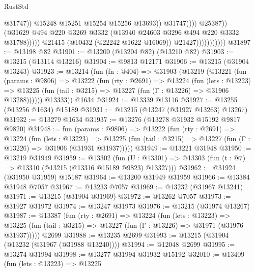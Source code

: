 \begin{lexlean}{RustStd}
\begin{coremodule}
                                                    @31747))
                                                @15248
                                                @15251
                                                @15254
                                                @15256
                                                @13693))
                                            @31747))))
                                    @25387))
                                (@31629
                                  @494
                                  @220
                                  @3269
                                  @3332
                                  (@13940 @24603 @3296 @494 @220 @3332 @31788)))))
                          @21415
                          (@10432 (@22242 @1622 @16069))
                          @21427)))))))))))
@31897 := @13198 @82
@31901 := @13200 (@13204 @82) (@13210 @82)
@31903 := @13215 (@13114 @13216)
@31904 := @9813 @12171
@31906 := @13215 (@31904 @13243)
@31923 := @13214
    (fun (fn : @404) =>
    @31903
      (@13219
        (@13221
          (fun (params : @9806) =>
          @13222
            (fun (rty : @2691) =>
            @13224
              (fun (lets : @13223) =>
              @13225 (fun (tail : @3215) => @13227 (fun (Γ : @13226) => @31906 @13288))))))
        @13333))
    @1634
@31924 := @13339 @13116
@31927 := @13255 (@13256 @1634) @15189
@31931 := @13215 (@13247 (@31927 @13263) @13267)
@31932 := @13279 @1634
@31937 := @13276 (@13278 @31932 @15192 @9817 @9820)
@31948 := fun (params : @9806) =>
  @13222
    (fun (rty : @2691) =>
    @13224
      (fun (lets : @13223) =>
      @13225 (fun (tail : @3215) => @13227 (fun (Γ : @13226) => @31906 (@31931 @31937)))))
@31949 := @13221 @31948
@31950 := @13219 @31949
@31959 := @13302
    (fun (U : @13301) => @13303 (fun (t : @7) => @13310 (@13215 (@13316 @15189 @9823) @13327)))
@31962 := @31924 (@31950 @31959) @15187
@31964 := @13200 @31949 @31959
@31966 := @13384 @31948 @7057
@31967 := @13233 @7057
@31969 := @13232 (@31967 @13241)
@31971 := @13215 (@31904 @31969)
@31972 := @13262 @7057
@31973 := @31927 @31972
@31974 := @13247 @31973
@31976 := @13215 (@31974 @13267)
@31987 := @13387
    (fun (rty : @2691) =>
    @13224
      (fun (lets : @13223) =>
      @13225 (fun (tail : @3215) => @13227 (fun (Γ : @13226) => @31971 (@31976 @31937)))))
    @2699
@31988 := @13235 @2699
@31993 := @13215 (@31904 (@13232 (@31967 (@31988 @13240))))
@31994 := @12048 @2699
@31995 := @13274 @31994
@31998 := @13277 @31994 @31932 @15192
@32010 := @13409
    (fun (lets : @13223) =>
    @13225

\end{coremodule}
\end{lexlean}
